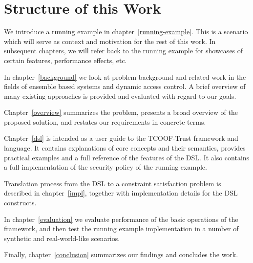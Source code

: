 
\section{Structure of this Work}

We introduce a running example in chapter~\ref{running-example}. This is a scenario
which will serve as context and motivation for the rest of this work. In subsequent
chapters, we will refer back to the running example for showcases of certain features,
performance effects, etc.

In chapter~\ref{background} we look at problem background and related work in the
fields of ensemble based systems and dynamic access control. A brief overview of many
existing approaches is provided and evaluated with regard to our goals.

Chapter~\ref{overview} summarizes the problem, presents a broad overview of the proposed
solution, and restates our requirements in concrete terms.

Chapter~\ref{dsl} is intended as a user guide to the TCOOF-Trust framework and language.
It contains explanations of core concepts and their semantics, provides practical
examples and a full reference of the features of the DSL. It also contains a full
implementation of the security policy of the running example.

Translation process from the DSL to a constraint satisfaction problem is described in
chapter~\ref{impl}, together with implementation details for the DSL constructs.

In chapter~\ref{evaluation} we evaluate performance of the basic operations of the
framework, and then test the running example implementation in a number of synthetic and
real-world-like scenarios.

Finally, chapter~\ref{conclusion} summarizes our findings and concludes the work.
